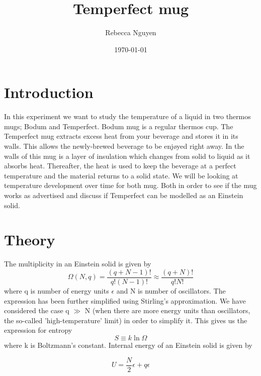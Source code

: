 \documentclass[reprint,english,notitlepage]{revtex4-2}
\begin{document}
\title{Temperfect mug}   %
\author{Rebecca Nguyen}               %
\date{\today}                             %
\noaffiliation
\maketitle                                %


\section{Introduction}
In this experiment we want to study the temperature of a liquid in two thermos mugs; Bodum and Temperfect.
Bodum mug is a regular thermos cup. The Temperfect mug extracts excess heat from your beverage and stores it in its walls. This allows the newly-brewed beverage to
be enjøyed right away. In the walls of this mug is a layer of insulation which changes from solid to liquid as it absorbs heat. Thereafter, the heat is used to keep
the beverage at a perfect temperature and the material returns to a solid state.
We will be looking at temperature development over time for both mug. Both in order to see if the mug works as advertised and discuss if Temperfect can be modelled
as an Einstein solid.

\section{Theory}
The multiplicity in an Einstein solid is given by
\begin{equation}
  \Omega(N, q) = \frac{(q+N -1)!}{q! (N -1)!} \approx \frac{(q+N)!}{q!N!}
\end{equation}
where q is number of energy units $\epsilon$ and N is number of oscillators. The expression has been further simplified using Stirling's approximation. We have considered the case q $\gg$ N (when there are
more energy units than oscillators, the so-called 'high-temperature' limit) in order to simplify it.
This gives us the expression for entropy
\begin{equation}
  S \equiv k \ln\Omega
\end{equation}
where k is Boltzmann's constant.
Internal energy of an Einstein solid is given by

\begin{equation}
  U = \frac{N}{2}\epsilon + q\epsilon
\end{equation}
\end{document}
